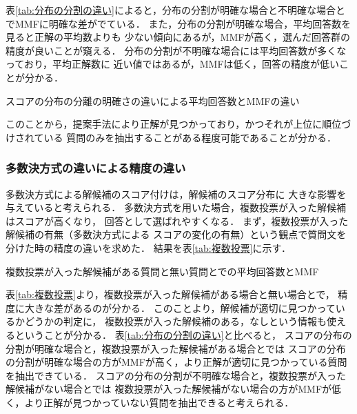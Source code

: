 \documentclass[japanese]{jnlp_1.4}
\begin{document}
表\ref{tab:分布の分割の違い}によると，分布の分割が明確な場合と不明確な場合とでMMFに明確な差がでている．
また，分布の分割が明確な場合，平均回答数を見ると正解の平均数よりも
少ない傾向にあるが，MMFが高く，選んだ回答群の精度が良いことが窺える．
分布の分割が不明確な場合には平均回答数が多くなっており，平均正解数に
近い値ではあるが，MMFは低く，回答の精度が低いことが分かる．

\begin{table}[b]
\caption{スコアの分布の分離の明確さの違いによる平均回答数とMMFの違い}
\label{tab:分布の分割の違い}
\begin{center}

\end{center}
\end{table}

このことから，提案手法により正解が見つかっており，かつそれが上位に順位づけされている
質問のみを抽出することがある程度可能であることが分かる．


\subsubsection{多数決方式の違いによる精度の違い}\label{subsec:多数決}

多数決方式による解候補のスコア付けは，解候補のスコア分布に
大きな影響を与えていると考えられる．
多数決方式を用いた場合，複数投票が入った解候補はスコアが高くなり，
回答として選ばれやすくなる．
まず，複数投票が入った解候補の有無（多数決方式による
スコアの変化の有無）という観点で質問文を分けた時の精度の違いを求めた．
結果を表\ref{tab:複数投票}に示す．

\begin{table}[b]
\caption{複数投票が入った解候補がある質問と無い質問とでの平均回答数とMMF}
\label{tab:複数投票}
\begin{center}

\end{center}
\end{table}

表\ref{tab:複数投票}より，複数投票が入った解候補がある場合と無い場合とで，
精度に大きな差があるのが分かる．
このことより，解候補が適切に見つかっているかどうかの判定に，
複数投票が入った解候補のある，なしという情報も使えるということが分かる．
表\ref{tab:分布の分割の違い}と比べると，
スコアの分布の分割が明確な場合と，複数投票が入った解候補がある場合とでは
スコアの分布の分割が明確な場合の方がMMFが高く，より正解が適切に見つかっている質問を抽出できている．
スコアの分布の分割が不明確な場合と，複数投票が入った解候補がない場合とでは
複数投票が入った解候補がない場合の方がMMFが低く，より正解が見つかっていない質問を抽出できると考えられる．
\end{document}
